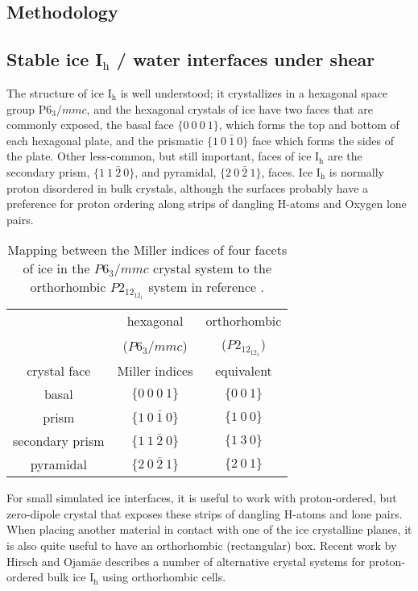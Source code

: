 \documentclass[11pt]{article}
\begin{document}
\begin{doublespace}
\section{Methodology}

\subsection{Stable ice I$_\mathrm{h}$ / water interfaces under shear}

The structure of ice I$_\mathrm{h}$ is well understood; it
crystallizes in a hexagonal space group P$6_3/mmc$, and the hexagonal
crystals of ice have two faces that are commonly exposed, the basal
face $\{0~0~0~1\}$, which forms the top and bottom of each hexagonal
plate, and the prismatic $\{1~0~\bar{1}~0\}$ face which forms the
sides of the plate. Other less-common, but still important, faces of
ice I$_\mathrm{h}$ are the secondary prism, $\{1~1~\bar{2}~0\}$, and
pyramidal, $\{2~0~\bar{2}~1\}$, faces.  Ice I$_\mathrm{h}$ is normally
proton disordered in bulk crystals, although the surfaces probably
have a preference for proton ordering along strips of dangling H-atoms
and Oxygen lone pairs.\cite{Buch:2008fk}

\begin{table}[h]
\centering
  \caption{Mapping between the Miller indices of four facets of ice in
    the $P6_3/mmc$ crystal system to the orthorhombic $P2_12_12_1$
    system in reference  \protect\citep{Hirsch04}.}
\label{tab:equiv}
\begin{tabular}{|ccc|} \hline
 & hexagonal & orthorhombic \\
 & ($P6_3/mmc$) & ($P2_12_12_1$) \\
 crystal face  & Miller indices & equivalent \\ \hline
basal & $\{0~0~0~1\}$ & $\{0~0~1\}$ \\
prism & $\{1~0~\bar{1}~0\}$ & $\{1~0~0\}$ \\
secondary prism & $\{1~1~\bar{2}~0\}$ & $\{1~3~0\}$ \\
pyramidal & $\{2~0~\bar{2}~1\}$ & $\{2~0~1\}$ \\ \hline
\end{tabular}
\end{table}
For small simulated ice interfaces, it is useful to work with
proton-ordered, but zero-dipole crystal that exposes these strips of
dangling H-atoms and lone pairs.  When placing another material in
contact with one of the ice crystalline planes, it is also quite
useful to have an orthorhombic (rectangular) box. Recent work by
Hirsch and Ojam\"{a}e describes a number of alternative crystal
systems for proton-ordered bulk ice I$_\mathrm{h}$ using orthorhombic
cells.\cite{Hirsch04}


\end{doublespace}
\end{document}
